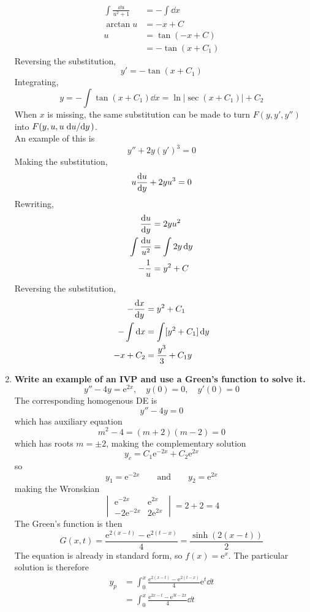 \documentclass[12pt]{article}
\newcommand{\en}{\text{e}}
\begin{document}
\begin{enumerate}
\begin{align*}
					\int \frac{\dd{u}}{u^2 + 1} &= -\int \dd{x} \\
					\arctan u &= -x + C \\
					u &= \tan(-x + C) \\
						&= -\tan(x + C_1)
				\end{align*}
				Reversing the substitution,
				\[y' = -\tan(x + C_1)\]
				Integrating,
				\[
					y = -\int \tan(x + C_1)\dd{x} 
						= \ln|\sec(x + C_1)| + C_2
				\]
			When \(x\) is missing, the same substitution can be made to turn \(F(y, y', y'')\) into \(F(y, u, u\dv*{u}{y})\). \\
			An example of this is 
				\[y'' + 2y(y')^3 = 0\]
				Making the substitution,
				\[u\dv{u}{y} + 2yu^3 = 0\]
				Rewriting,
				\begin{align*}
					\dv{u}{y} &= 2yu^2  \\
					\int \frac{\dd{u}}{u^2} &= \int 2y\dd{y} \\
					-\frac{1}{u} &= y^2 + C
				\end{align*}
				Reversing the substitution,
				\begin{align*}
					-\dv{x}{y} &= y^2 + C_1 \\
					-\int \dd{x} &= \int [y^2 + C_1]\dd{y} \\
					-x + C_2 &= \frac{y^3}{3} + C_1y
				\end{align*}
		\item \textbf{Write an example of an IVP and use a Green's function to solve it.}
			\[y'' - 4y = \en^{2x}, \quad y(0) = 0, \quad y'(0) = 0\]
				The corresponding homogenous DE is
				\[y'' - 4y = 0\]
				which has auxiliary equation
				\[m^2 - 4 = (m + 2)(m - 2) = 0\]
				which has roots \(m = \pm 2\), making the complementary solution
				\[y_c = C_1\en^{-2x} + C_2\en^{2x}\]
				so
				\[y_1 = \en^{-2x} \qquad \text{and} \qquad y_2 = \en^{2x}\]
				making the Wronskian
				\[
					\begin{vmatrix}
						\en^{-2x} & \en^{2x} \\
						-2\en^{-2x} & 2\en^{2x}
					\end{vmatrix} = 2 + 2 = 4
				\]
				The Green's function is then
				\[G(x, t) = \frac{\en^{2(x - t)} - \en^{2(t - x)}}{4} = \frac{\sinh(2(x - t))}{2}\]
				The equation is already in standard form, so \(f(x) = \en^{x}\). The particular solution is therefore
				\begin{align*}
					y_p &= \int_0^x \frac{\en^{2(x - t)} - \en^{2(t - x)}}{4}\en^{t}\dd{t} \\
						&= \int_0^x \frac{\en^{2x - t} - \en^{3t - 2x}}{4}\dd{t} \\

\end{align*}
\end{enumerate}
\end{document}
